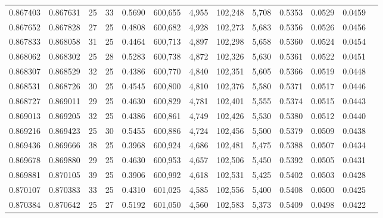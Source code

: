 \begin{tabular}{rrrrrrrrrrrrr}
0.867403 & 0.867631 &    25 &  33 &                                     0.5690 & 600,655 &   4,955 & 102,248 &   5,708 & 0.5353 & 0.0529 & 0.0459 \\
0.867652 & 0.867828 &    27 &  25 &                                     0.4808 & 600,682 &   4,928 & 102,273 &   5,683 & 0.5356 & 0.0526 & 0.0456 \\
0.867833 & 0.868058 &    31 &  25 &                                     0.4464 & 600,713 &   4,897 & 102,298 &   5,658 & 0.5360 & 0.0524 & 0.0454 \\
0.868062 & 0.868302 &    25 &  28 &                                     0.5283 & 600,738 &   4,872 & 102,326 &   5,630 & 0.5361 & 0.0522 & 0.0451 \\
0.868307 & 0.868529 &    32 &  25 &                                     0.4386 & 600,770 &   4,840 & 102,351 &   5,605 & 0.5366 & 0.0519 & 0.0448 \\
0.868531 & 0.868726 &    30 &  25 &                                     0.4545 & 600,800 &   4,810 & 102,376 &   5,580 & 0.5371 & 0.0517 & 0.0446 \\
0.868727 & 0.869011 &    29 &  25 &                                     0.4630 & 600,829 &   4,781 & 102,401 &   5,555 & 0.5374 & 0.0515 & 0.0443 \\
0.869013 & 0.869205 &    32 &  25 &                                     0.4386 & 600,861 &   4,749 & 102,426 &   5,530 & 0.5380 & 0.0512 & 0.0440 \\
0.869216 & 0.869423 &    25 &  30 &                                     0.5455 & 600,886 &   4,724 & 102,456 &   5,500 & 0.5379 & 0.0509 & 0.0438 \\
0.869436 & 0.869666 &    38 &  25 &                                     0.3968 & 600,924 &   4,686 & 102,481 &   5,475 & 0.5388 & 0.0507 & 0.0434 \\
0.869678 & 0.869880 &    29 &  25 &                                     0.4630 & 600,953 &   4,657 & 102,506 &   5,450 & 0.5392 & 0.0505 & 0.0431 \\
0.869881 & 0.870105 &    39 &  25 &                                     0.3906 & 600,992 &   4,618 & 102,531 &   5,425 & 0.5402 & 0.0503 & 0.0428 \\
0.870107 & 0.870383 &    33 &  25 &                                     0.4310 & 601,025 &   4,585 & 102,556 &   5,400 & 0.5408 & 0.0500 & 0.0425 \\
0.870384 & 0.870642 &    25 &  27 &                                     0.5192 & 601,050 &   4,560 & 102,583 &   5,373 & 0.5409 & 0.0498 & 0.0422 \\

\end{tabular}
